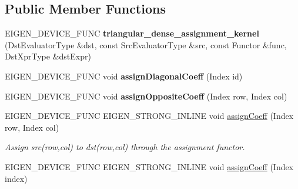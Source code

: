 \subsection*{Public Member Functions}
\begin{DoxyCompactItemize}
\item 
\mbox{\label{class_eigen_1_1internal_1_1triangular__dense__assignment__kernel_aa2a9bd0214adb7f1bb43ea6fc81c2f18}} 
E\+I\+G\+E\+N\+\_\+\+D\+E\+V\+I\+C\+E\+\_\+\+F\+U\+NC {\bfseries triangular\+\_\+dense\+\_\+assignment\+\_\+kernel} (Dst\+Evaluator\+Type \&dst, const Src\+Evaluator\+Type \&src, const Functor \&func, Dst\+Xpr\+Type \&dst\+Expr)
\item 
\mbox{\label{class_eigen_1_1internal_1_1triangular__dense__assignment__kernel_a5df49eb21fc70622e8c1180f1993b26d}} 
E\+I\+G\+E\+N\+\_\+\+D\+E\+V\+I\+C\+E\+\_\+\+F\+U\+NC void {\bfseries assign\+Diagonal\+Coeff} (Index id)
\item 
\mbox{\label{class_eigen_1_1internal_1_1triangular__dense__assignment__kernel_a54a1a283bd1d1008a766540888832876}} 
E\+I\+G\+E\+N\+\_\+\+D\+E\+V\+I\+C\+E\+\_\+\+F\+U\+NC void {\bfseries assign\+Opposite\+Coeff} (Index row, Index col)
\item 
\mbox{\label{class_eigen_1_1internal_1_1triangular__dense__assignment__kernel_a7ca974cc4049f1ef3d6f2feac94ea35b}} 
E\+I\+G\+E\+N\+\_\+\+D\+E\+V\+I\+C\+E\+\_\+\+F\+U\+NC E\+I\+G\+E\+N\+\_\+\+S\+T\+R\+O\+N\+G\+\_\+\+I\+N\+L\+I\+NE void \mbox{\hyperlink{class_eigen_1_1internal_1_1triangular__dense__assignment__kernel_a7ca974cc4049f1ef3d6f2feac94ea35b}{assign\+Coeff}} (Index row, Index col)
\begin{DoxyCompactList}\small\item\em Assign src(row,col) to dst(row,col) through the assignment functor. \end{DoxyCompactList}\item 
E\+I\+G\+E\+N\+\_\+\+D\+E\+V\+I\+C\+E\+\_\+\+F\+U\+NC E\+I\+G\+E\+N\+\_\+\+S\+T\+R\+O\+N\+G\+\_\+\+I\+N\+L\+I\+NE void \mbox{\hyperlink{class_eigen_1_1internal_1_1triangular__dense__assignment__kernel_a9f36120222600d1d843b4253b08a383b}{assign\+Coeff}} (Index index)
\end{DoxyCompactItemize}
